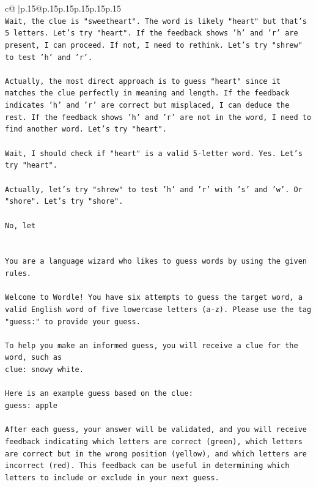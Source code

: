 \documentclass{article}
\begin{document}
{\begin{supertabular}{c@{$\;$}|p{.15\linewidth}@{}p{.15\linewidth}p{.15\linewidth}p{.15\linewidth}p{.15\linewidth}p{.15\linewidth}}
{{{\\ 
\texttt{Wait, the clue is "sweetheart". The word is likely "heart" but that's 5 letters. Let's try "heart". If the feedback shows 'h' and 'r' are present, I can proceed. If not, I need to rethink. Let's try "shrew" to test 'h' and 'r'.} \\
\\ 
\texttt{Actually, the most direct approach is to guess "heart" since it matches the clue perfectly in meaning and length. If the feedback indicates 'h' and 'r' are correct but misplaced, I can deduce the rest. If the feedback shows 'h' and 'r' are not in the word, I need to find another word. Let's try "heart".} \\
\\ 
\texttt{Wait, I should check if "heart" is a valid 5{-}letter word. Yes. Let's try "heart".} \\
\\ 
\texttt{Actually, let's try "shrew" to test 'h' and 'r' with 's' and 'w'. Or "shore". Let's try "shore".} \\
\\ 
\texttt{No, let} \\
\\ 
\\ 
\texttt{You are a language wizard who likes to guess words by using the given rules.} \\
\\ 
\texttt{Welcome to Wordle! You have six attempts to guess the target word, a valid English word of five lowercase letters (a{-}z). Please use the tag "guess:" to provide your guess.} \\
\\ 
\texttt{To help you make an informed guess, you will receive a clue for the word, such as} \\
\texttt{clue: snowy white.} \\
\\ 
\texttt{Here is an example guess based on the clue: } \\
\texttt{guess: apple} \\
\\ 
\texttt{After each guess, your answer will be validated, and you will receive feedback indicating which letters are correct (green), which letters are correct but in the wrong position (yellow), and which letters are incorrect (red). This feedback can be useful in determining which letters to include or exclude in your next guess.} \\
\\ 
}}}
\end{supertabular}}
\end{document}
